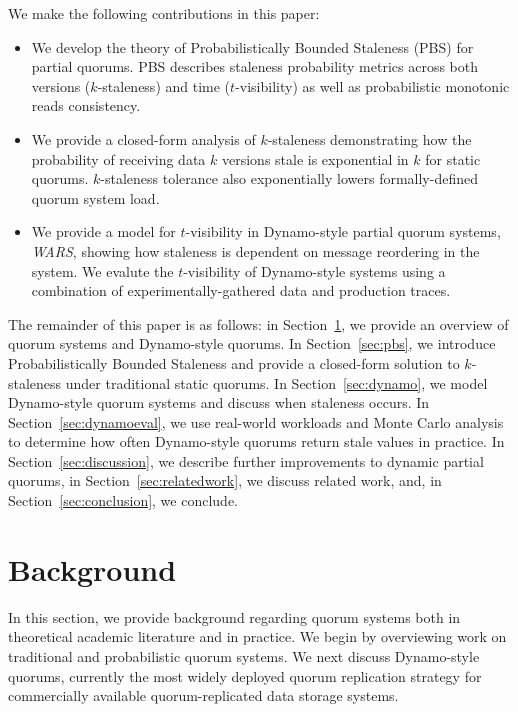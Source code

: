 \documentclass{vldb}
\begin{document}
We make the following contributions in this paper:

\begin{itemize}

\item We develop the theory of Probabilistically Bounded Staleness
  (PBS) for partial quorums. PBS describes staleness probability
  metrics across both versions ($k$-staleness) and time
  ($t$-visibility) as well as probabilistic monotonic reads
  consistency.

\item We provide a closed-form analysis of $k$-staleness demonstrating
  how the probability of receiving data $k$ versions stale is
  exponential in $k$ for static quorums.  $k$-staleness tolerance also
  exponentially lowers formally-defined quorum system load.

\item We provide a model for $t$-visibility in
  Dynamo-style partial quorum systems, \textit{WARS},  showing how
  staleness is dependent on message reordering in the system.  We
  evalute the $t$-visibility of Dynamo-style systems using a
  combination of experimentally-gathered data and production traces.

\end{itemize}

The remainder of this paper is as follows: in
Section~\ref{sec:background}, we provide an overview of quorum systems
and Dynamo-style quorums.  In Section~\ref{sec:pbs}, we introduce
Probabilistically Bounded Staleness and provide a closed-form solution
to $k$-staleness under traditional static quorums.  In
Section~\ref{sec:dynamo}, we model Dynamo-style quorum systems and
discuss when staleness occurs.  In Section~\ref{sec:dynamoeval}, we
use real-world workloads and Monte Carlo analysis to determine how often Dynamo-style quorums return stale values in practice.  In Section~\ref{sec:discussion}, we describe further improvements to dynamic partial quorums, in Section~\ref{sec:relatedwork}, we discuss related work, and, in Section~\ref{sec:conclusion}, we conclude.


\section{Background}
\label{sec:background}

In this section, we provide background regarding quorum systems both
in theoretical academic literature and in practice.  We begin by
overviewing work on traditional and probabilistic quorum systems.  We
next discuss Dynamo-style quorums, currently the most widely deployed
quorum replication strategy for commercially available
quorum-replicated data storage systems.
\end{document}
